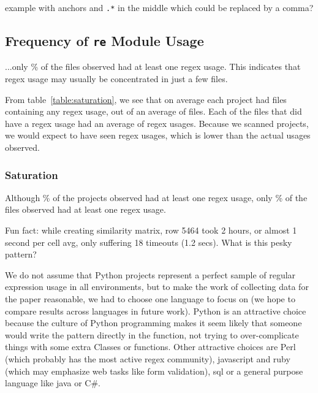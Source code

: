 example with anchors and {\tt .*} in the middle which could be replaced by a comma?

\subsection{Frequency of {\tt re} Module Usage}
...only \% of the files observed had at least one regex usage.  This indicates that regex usage may usually be concentrated in just a few files.


From table~\ref{table:saturation}, we see that on average each project had  files containing any regex usage, out of an average of  files.  Each of the files that did have a regex usage had an average of  regex usages.  Because we scanned  projects, we would expect to have seen  regex usages, which is lower than the actual  usages observed.
\subsubsection{Saturation}Although \% of the projects observed had at least one regex usage, only \% of the files observed had at least one regex usage.



Fun fact: while creating similarity matrix, row 5464 took 2 hours, or almost 1 second per cell avg, only suffering 18 timeouts (1.2 secs).  What is this pesky pattern?

We do not assume that Python projects represent a perfect sample of regular expression usage in all environments, but to make the work of collecting data for the paper reasonable, we had to choose one language to focus on (we hope to compare results across languages in future work).  Python is an attractive choice because the culture of Python programming makes it seem likely that someone would write the pattern directly in the function, not trying to over-complicate things with some extra Classes or functions.  Other attractive choices are Perl (which probably has the most active regex community), javascript and ruby (which may emphasize web tasks like form validation), sql or a general purpose language like java or C\#.

